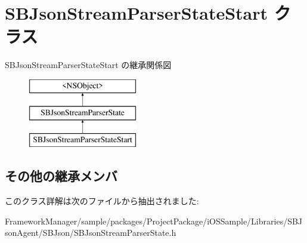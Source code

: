\hypertarget{interface_s_b_json_stream_parser_state_start}{}\section{S\+B\+Json\+Stream\+Parser\+State\+Start クラス}
\label{interface_s_b_json_stream_parser_state_start}
S\+B\+Json\+Stream\+Parser\+State\+Start の継承関係図\begin{figure}[H]
\begin{center}
\leavevmode
\includegraphics[height=3.000000cm]{interface_s_b_json_stream_parser_state_start}
\end{center}
\end{figure}
\subsection*{その他の継承メンバ}


このクラス詳解は次のファイルから抽出されました\+:\begin{DoxyCompactItemize}
\item 
Framework\+Manager/sample/packages/\+Project\+Package/i\+O\+S\+Sample/\+Libraries/\+S\+B\+Json\+Agent/\+S\+B\+Json/S\+B\+Json\+Stream\+Parser\+State.\+h\end{DoxyCompactItemize}
